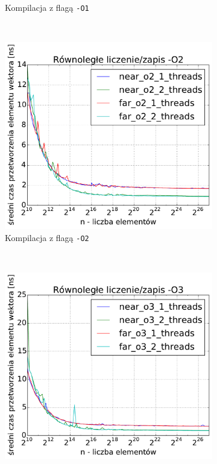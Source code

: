 \begin{figure}
\begin{subfigure}[c]{0.45\textwidth}
        \caption{Kompilacja z flagą \texttt{-O1}}
    \end{subfigure}
    \\
    \vspace{0.2cm}
    \begin{subfigure}[c]{0.45\textwidth}
        \centering
        \includegraphics[width=\textwidth]{images/benchs/parallel_count_1_2_O2}
        \caption{Kompilacja z flagą \texttt{-O2}}
    \end{subfigure}
    ~
    \begin{subfigure}[c]{0.45\textwidth}
        \centering
        \includegraphics[width=\textwidth]{images/benchs/parallel_count_1_2_O3}

\end{subfigure}
\end{figure}
